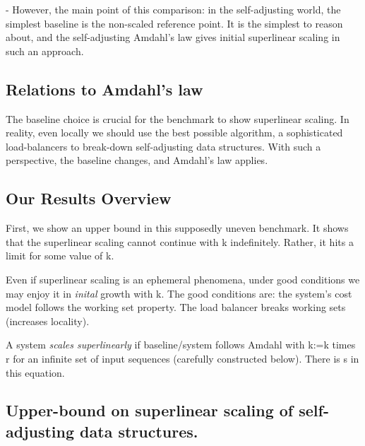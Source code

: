 - However, the main point of this comparison: in the self-adjusting world, the simplest baseline is the non-scaled reference point. It is the simplest to reason about, and the self-adjusting Amdahl's law gives initial superlinear scaling in such an approach.


\subsection{Relations to Amdahl's law}

The baseline choice is crucial for the benchmark to show superlinear scaling.
In reality, even locally we should use the best possible algorithm, a sophisticated load-balancers to break-down self-adjusting data structures.
With such a perspective, the baseline changes, and Amdahl's law applies.

\subsection{Our Results Overview}

First, we show an upper bound in this supposedly uneven benchmark.
It shows that the superlinear scaling cannot continue with k indefinitely. Rather, it hits a limit for some value of k.

Even if superlinear scaling is an ephemeral phenomena, under good conditions we may enjoy it in \emph{inital} growth with k.
The good conditions are: the system's cost model follows the working set property. The load balancer breaks working sets (increases locality).








A system \emph{scales superlinearly} if baseline/system follows Amdahl with k:=k times r for an infinite set of input sequences (carefully constructed below). There is s in this equation.




\subsection{Upper-bound on superlinear scaling of self-adjusting data structures.}

